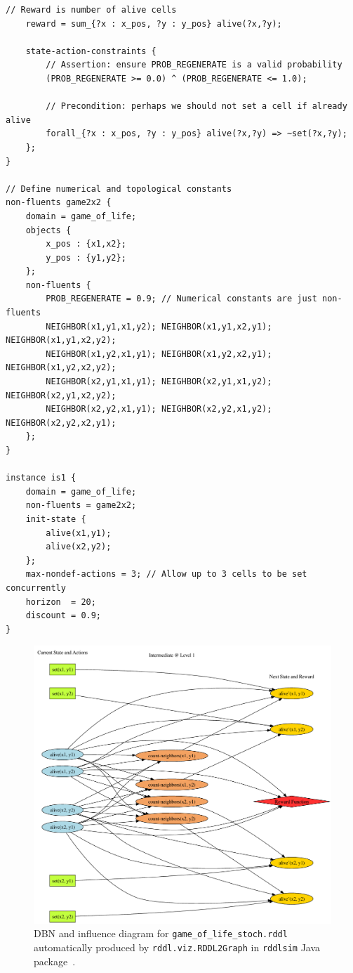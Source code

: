 \documentclass[11pt,a4paper]{article}
\begin{document}
\begin{lstlisting}[title=game\_of\_life\_stoch.rddl]
    // Reward is number of alive cells
	reward = sum_{?x : x_pos, ?y : y_pos} alive(?x,?y);
	
	state-action-constraints {
		// Assertion: ensure PROB_REGENERATE is a valid probability
		(PROB_REGENERATE >= 0.0) ^ (PROB_REGENERATE <= 1.0); 
		
		// Precondition: perhaps we should not set a cell if already alive
		forall_{?x : x_pos, ?y : y_pos} alive(?x,?y) => ~set(?x,?y);
	};
}

// Define numerical and topological constants   
non-fluents game2x2 {
	domain = game_of_life;
	objects { 
		x_pos : {x1,x2};
		y_pos : {y1,y2};
	};
	non-fluents { 
		PROB_REGENERATE = 0.9; // Numerical constants are just non-fluents
		NEIGHBOR(x1,y1,x1,y2); NEIGHBOR(x1,y1,x2,y1); NEIGHBOR(x1,y1,x2,y2);
		NEIGHBOR(x1,y2,x1,y1); NEIGHBOR(x1,y2,x2,y1); NEIGHBOR(x1,y2,x2,y2);
		NEIGHBOR(x2,y1,x1,y1); NEIGHBOR(x2,y1,x1,y2); NEIGHBOR(x2,y1,x2,y2);
		NEIGHBOR(x2,y2,x1,y1); NEIGHBOR(x2,y2,x1,y2); NEIGHBOR(x2,y2,x2,y1);
	};
}
        
instance is1 {
	domain = game_of_life;	
	non-fluents = game2x2;
	init-state { 
		alive(x1,y1); 
		alive(x2,y2); 
	};
	max-nondef-actions = 3; // Allow up to 3 cells to be set concurrently
	horizon  = 20;
	discount = 0.9;
}
\end{lstlisting}

\begin{figure}[t!]
\hspace{-5mm} \includegraphics[scale=.81]{game_of_life2.pdf}
\caption{DBN and influence diagram 
for \texttt{game\_of\_life\_stoch.rddl} automatically
produced by \texttt{rddl.viz.RDDL2Graph} in \texttt{rddlsim} Java 
package~\cite{rddlsim}.}
\label{fig:rddl3}
\end{figure}
\end{document}
